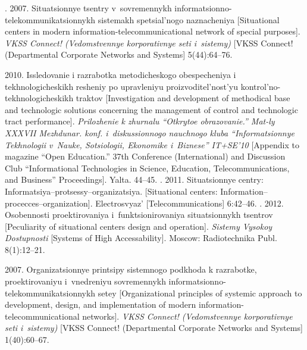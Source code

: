   \begin{multicols}{2}

\renewcommand{\bibname}{\protect\rmfamily References}



{\small\frenchspacing
 {%
 \begin{thebibliography}{99}

. 2007. Situatsionnye tsentry
v~sovremennykh informatsionno-telekommunikatsionnykh sistemakh spetsial'nogo
naznacheniya [Situational centers in modern information-telecommunicational network of
special purposes]. \textit{VKSS Connect! (Vedomstvennye korporativnye seti i~sistemy)}
[VKSS Connect! (Departmental Corporate Networks and Systems] 5(44):64--76.

 2010. Issledovanie i razrabotka metodicheskogo
obespecheniya i tekhnologicheskikh resheniy po upravleniyu proizvoditel'nost'yu
kontrol'no-tekhnologicheskikh traktov [Investigation and development of methodical base and
technologic solutions concerning the
 management of control and technologic tract performance].
\textit{Prilozhenie k zhurnalu ``Otkrytoe obrazovanie.'' Mat-ly XXXVII Mezhdunar. konf.
i~diskussionnogo nauchnogo kluba ``Informatsionnye Tekhnologii v~Nauke, Sotsiologii,
Ekonomike i~Biznese'' IT\;+\;SE'10} [Appendix to magazine ``Open Education.'' 37th
Conference (International) and Discussion Club ``Informational Technologies in Science, Education,
Telecommunications, and Business'' Proceedings].  Yalta. 44--45.
. 2011. Situatsionnye centry:
Informatsiya--protsessy--organizatsiya. [Situational centers:
Information--procecces--organization].
Electrosvyaz' [Telecommunications] 6:42--46.
. 2012. Osobennosti
proektirovaniya i~funktsionirovaniya situ\-atsi\-on\-nykh tsentrov [Peculiarity of situational centers
design and operation]. \textit{Sistemy Vysokoy Dostupnosti} [Systems of High Accessability].
Moscow: Radiotechnika Publ. 8(1):12--21.

 2007. Organizatsionnye printsipy sistemnogo podkhoda k razrabotke,
proektirovaniyu i~vnedreniyu sovremennykh in\-for\-ma\-tsi\-on\-no-te\-le\-kom\-mu\-ni\-ka\-tsi\-on\-nykh setey
[Organizational principles of systemic approach to development, design, and implementation of
modern information-telecommunicational networks]. \textit{VKSS Connect! (Vedomstvennye
korporativnye seti i~sistemy)} [VKSS Connect! (Departmental Corporate Networks and
Systems] 1(40):60--67.


\end{thebibliography}}}
\end{multicols}
